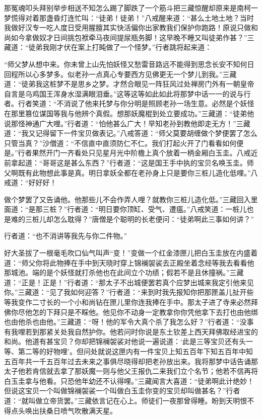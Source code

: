 \documentclass[12pt,UTF8]{ctexbook}
\begin{document}
那冤魂叩头拜别举步相送不知怎么踢了脚跌了一个筋斗把三藏惊醒却原来是南柯一梦慌得对着那盏昏灯连忙叫：“徒弟！徒弟！”八戒醒来道：“甚么土地土地？当时我做好汉专一吃人度日受用腥膻其实快活偏你出家教我们保护你跑路！原说只做和尚如今拿做奴才日间挑包袱牵马夜间提尿瓶务脚！这早晚不睡又叫徒弟作甚？”三藏道：“徒弟我刚才伏在案上打盹做了一个怪梦。”行者跳将起来道：

“师父梦从想中来。你未曾上山先怕妖怪又愁雷音路远不能得到思念长安不知何日回程所以心多梦多。似老孙一点真心专要西方见佛更无一个梦儿到我。”三藏道：“徒弟我这桩梦不是思乡之梦。才然合眼见一阵狂风过处禅房门外有一朝皇帝自言是乌鸡国王浑身水湿满眼泪垂。”这等这等如此如此将那梦中话一一的说与行者。行者笑道：“不消说了他来托梦与你分明是照顾老孙一场生意。必然是个妖怪在那里篡位谋国等我与他辨个真假。想那妖魔棍到处立要成功。”三藏道：“徒弟他说那怪神通广大哩。”行者道：“怕他甚么广大！早知老孙到教他即走无方！”三藏道：“我又记得留下一件宝贝做表记。”八戒答道：“师父莫要胡缠做个梦便罢了怎么只管当真？”沙僧道：“不信直中直须防仁不仁。我们打起火开了门看看如何便是。”行者果然开门一齐看处只见星月光中阶檐上真个放着一柄金厢白玉圭。八戒近前拿起道：“哥哥这是甚么东西？”行者道：“这是国王手中执的宝贝名唤玉圭。师父啊既有此物想此事是真。明日拿妖全都在老孙身上只是要你三桩儿造化低哩。”八戒道：“好好好！

做个梦罢了又告诵他。他那些儿不会作弄人哩？就教你三桩儿造化低。”三藏回入里面道：“是那三桩？”行者道：“明日要你顶缸、受气、遭瘟。”八戒笑道：一桩儿也是难的三桩儿却怎么耽得？”唐僧是个聪明的长老便问：“徒弟啊此三事如何讲？”

行者道：“也不消讲等我先与你二件物。”

好大圣拔了一根毫毛吹口仙气叫声“变！”变做一个红金漆匣儿把白玉圭放在内盛着道：“师父你将此物捧在手中到天晓时穿上锦襕袈裟去正殿坐着念经等我去看看他那城池。端的是个妖怪就打杀他也在此间立个功绩；假若不是且休撞祸。”三藏道：“正是！正是！”行者道：“那太子不出城便罢若真个应梦出城来我定引他来见你。”三藏道：“见了我如何迎答？”行者道：“来到时我先报知你把那匣盖儿扯开些等我变作二寸长的一个小和尚钻在匣儿里你连我捧在手中。那太子进了寺来必然拜佛你尽他怎的下拜只是不睬他。他见你不动身一定教拿你你凭他拿下去打也由他绑也由他杀也由他。”三藏道：“呀！他的军令大真个杀了我怎么好？”行者道：“没事有我哩若到那紧关处我自然护你。他若问时你说是东土钦差上西天拜佛取经进宝的和尚。他道有甚宝贝？你却把锦襕袈裟对他说一遍说道：‘此是三等宝贝还有头一等、第二等的好物哩’。但问处就说这匣内有一件宝贝上知五百年下知五百年中知五百年共一千五百年过去未来之事俱尽晓得却把老孙放出来。我将那梦中话告诵那太子他若肯信就去拿了那妖魔一则与他父王报仇二来我们立个名节；他若不信再将白玉圭拿与他看。只恐他年幼还不认得哩。”三藏闻言大喜道：“徒弟啊此计绝妙！但说这宝贝一个叫做锦襕袈裟一个叫做白玉圭你变的宝贝却叫做甚名？”行者道：“就叫做立帝货罢。”三藏依言记在心上。师徒们一夜那曾得睡。盼到天明恨不得点头唤出扶桑日喷气吹散满天星。
\end{document}
